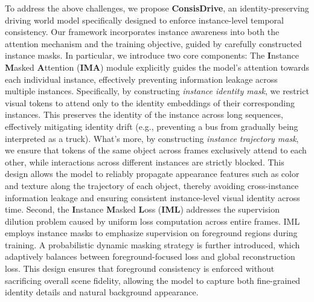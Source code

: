 \documentclass{article} %
\begin{document}
To address the above challenges, we propose \textbf{ConsisDrive}, an identity-preserving driving world model specifically designed to enforce instance-level temporal consistency. 
Our framework incorporates instance awareness into both the attention mechanism and the training objective, guided by carefully constructed instance masks. 
In particular, we introduce two core components: 
%
The \textbf{I}nstance \textbf{M}asked \textbf{A}ttention (\textbf{IMA}) module explicitly guides the model’s attention towards each individual instance, effectively preventing information leakage across multiple instances.
Specifically, by constructing \textit{instance identity mask}, we restrict visual tokens to attend only to the identity embeddings of their corresponding instances. 
This preserves the identity of the instance across long sequences, effectively mitigating identity drift (e.g., preventing a bus from gradually being interpreted as a truck). 
% 
What's more, by constructing \textit{instance trajectory mask}, we ensure that tokens of the same object across frames exclusively attend to each other, while interactions across different instances are strictly blocked. 
This design allows the model to reliably propagate appearance features such as color and texture along the trajectory of each object, thereby avoiding cross-instance information leakage and ensuring consistent instance-level visual identity across time. 
%
Second, the \textbf{I}nstance \textbf{M}asked \textbf{L}oss (\textbf{IML}) addresses the supervision dilution problem caused by uniform loss computation across entire frames. 
IML employs instance masks to emphasize supervision on foreground regions during training. A probabilistic dynamic masking strategy is further introduced, which adaptively balances between foreground-focused loss and global reconstruction loss. This design ensures that foreground consistency is enforced without sacrificing overall scene fidelity, allowing the model to capture both fine-grained identity details and natural background appearance. 
\end{document}
